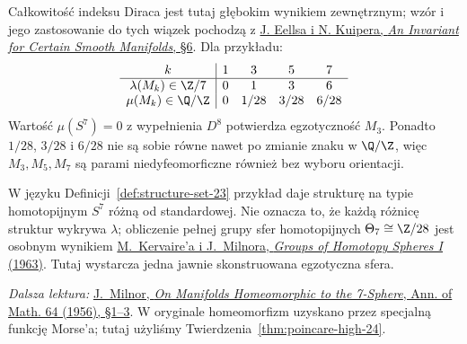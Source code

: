 Całkowitość indeksu Diraca jest tutaj
głębokim wynikiem zewnętrznym; wzór
i jego zastosowanie do tych wiązek
pochodzą z
\href{https://webhomes.maths.ed.ac.uk/~v1ranick/papers/eelskuip.pdf}
{J. Eellsa i N. Kuipera,
\emph{An Invariant for Certain Smooth
Manifolds}, §6}. Dla przykładu:
\[
\begin{array}{c|cccc}
 k&1&3&5&7\\ \hline
 \lambda(M_k)\in\Z/7&0&1&3&6\\
 \mu(M_k)\in\Q/\Z&0&1/28&3/28&6/28
\end{array}
\]
Wartość $\mu(S^7)=0$ z wypełnienia
$D^8$ potwierdza egzotyczność $M_3$.
Ponadto $1/28$, $3/28$ i $6/28$
nie są sobie równe nawet po zmianie
znaku w $\Q/\Z$, więc $M_3,M_5,M_7$
są parami niedyfeomorficzne również
bez wyboru orientacji.

W języku
Definicji~\ref{def:structure-set-23}
przykład daje strukturę na
typie homotopijnym $S^7$
różną od standardowej.
Nie oznacza to, że każdą
różnicę struktur wykrywa
$\lambda$; obliczenie pełnej
grupy sfer homotopijnych
$\Theta_7\cong\Z/28$ jest
osobnym wynikiem
\href{https://www.sas.rochester.edu/mth/sites/doug-ravenel/otherpapers/kervaire-milnor.pdf}
{M.\ Kervaire'a i J.\ Milnora,
\emph{Groups of Homotopy Spheres I}
(1963)}. Tutaj wystarcza
jedna jawnie skonstruowana
egzotyczna sfera.

\par\smallskip
{\footnotesize\noindent\emph{Dalsza lektura:}
\href{https://sites.math.rutgers.edu/~feehan/teaching/math866/milnor7sphere.pdf}
{J.\ Milnor, \emph{On Manifolds Homeomorphic
to the 7-Sphere}, Ann. of Math. 64 (1956),
§1--3}. W oryginale homeomorfizm
uzyskano przez specjalną funkcję
Morse'a; tutaj użyliśmy
Twierdzenia~\ref{thm:poincare-high-24}.\par}

\clearpage
